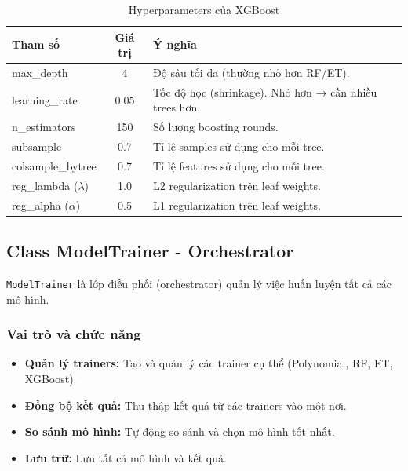 \documentclass[12pt,a4paper]{article}
\begin{document}
\begin{table}[H]
\centering
\caption{Hyperparameters của XGBoost}
\begin{tabular}{|l|c|p{6.5cm}|}
\hline
\textbf{Tham số} & \textbf{Giá trị} & \textbf{Ý nghĩa} \\
\hline
max\_depth & 4 & Độ sâu tối đa (thường nhỏ hơn RF/ET). \\
\hline
learning\_rate & 0.05 & Tốc độ học (shrinkage). Nhỏ hơn → cần nhiều trees hơn. \\
\hline
n\_estimators & 150 & Số lượng boosting rounds. \\
\hline
subsample & 0.7 & Tỉ lệ samples sử dụng cho mỗi tree. \\
\hline
colsample\_bytree & 0.7 & Tỉ lệ features sử dụng cho mỗi tree. \\
\hline
reg\_lambda ($\lambda$) & 1.0 & L2 regularization trên leaf weights. \\
\hline
reg\_alpha ($\alpha$) & 0.5 & L1 regularization trên leaf weights. \\
\hline
\end{tabular}
\end{table}

\subsection{Class ModelTrainer - Orchestrator}

\texttt{ModelTrainer} là lớp điều phối (orchestrator) quản lý việc huấn luyện tất cả các mô hình.

\subsubsection{Vai trò và chức năng}

\begin{itemize}
    \item \textbf{Quản lý trainers:} Tạo và quản lý các trainer cụ thể (Polynomial, RF, ET, XGBoost).
    \item \textbf{Đồng bộ kết quả:} Thu thập kết quả từ các trainers vào một nơi.
    \item \textbf{So sánh mô hình:} Tự động so sánh và chọn mô hình tốt nhất.
    \item \textbf{Lưu trữ:} Lưu tất cả mô hình và kết quả.
\end{itemize}
\end{document}
